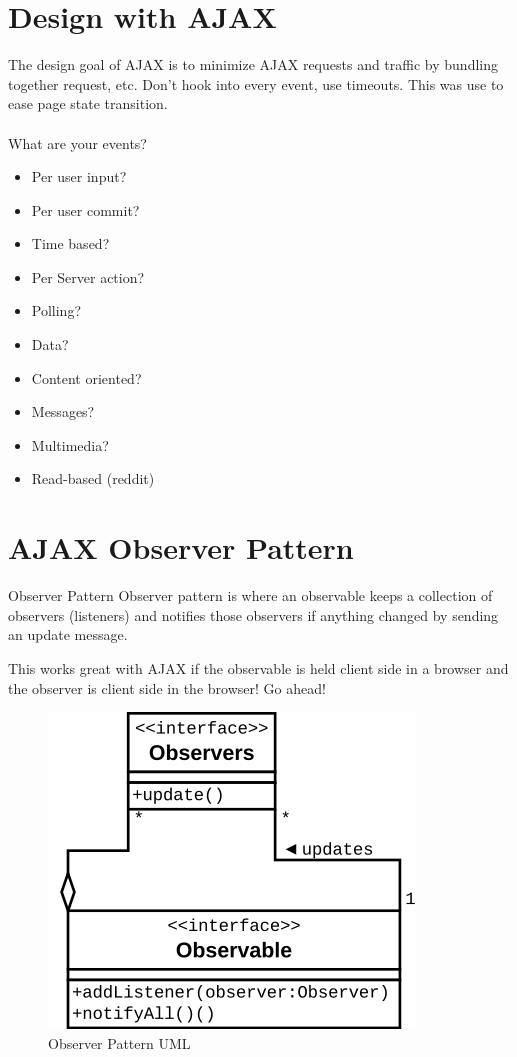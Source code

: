 \documentclass[../CMPUT-404-Notes.tex]{subfiles}
\begin{document}
\section{Design with AJAX}
The design goal of AJAX is to minimize AJAX requests and traffic by bundling together request, etc.
Don't hook into every event, use timeouts. 
This was use to ease page state transition.
\\~\\
What are your events?
\begin{itemize}
    \item Per user input?
    \item Per user commit?
    \item Time based?
    \item Per Server action?
    \item Polling?
    \item Data?
    \item Content oriented?
    \item Messages?
    \item Multimedia?
    \item Read-based (reddit)
\end{itemize}

\section{AJAX Observer Pattern}
\begin{DndSidebar}[color=PhbLightGreen]{Observer Pattern}
    Observer pattern is where an observable keeps a collection of observers (listeners) and notifies those observers if anything changed by sending an update message.
\end{DndSidebar}
This works great with AJAX if the observable is held client side in a browser and the observer is client side in the browser! Go ahead!

\begin{figure}[htbp]
    \centering
    \includegraphics[width=0.8\columnwidth]{../assets/observer.png}
    \caption{Observer Pattern UML}
    \label{fig:observer-pat}
\end{figure}
\end{document}
